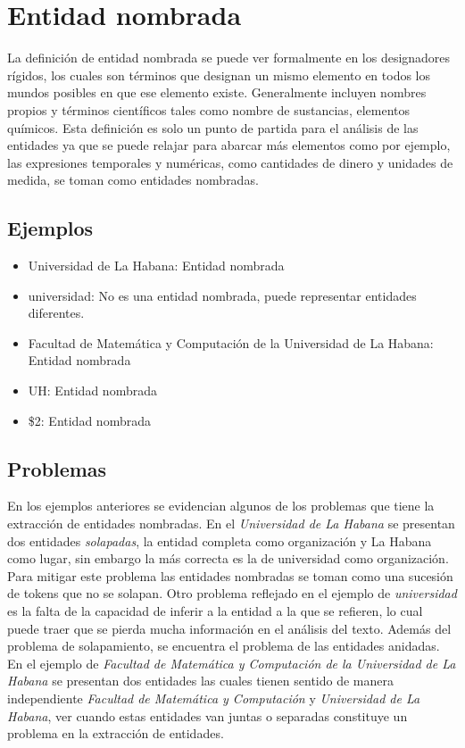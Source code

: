 \documentclass[runningheads]{llncs}
\begin{document}
\section{Entidad nombrada}

La definición de entidad nombrada se puede ver formalmente en los designadores rígidos\cite{rigid_designator}, los cuales son términos que designan un mismo elemento en todos los mundos posibles en que ese elemento existe. Generalmente incluyen nombres propios y términos científicos tales como nombre de sustancias, elementos químicos. Esta definición es solo un punto de partida para el análisis de las entidades ya que se puede relajar  para abarcar más elementos como por ejemplo, las expresiones temporales y numéricas, como cantidades de dinero y unidades de medida, se toman como entidades nombradas. 

\subsection{Ejemplos}

\begin{itemize}

\item Universidad de La Habana: Entidad nombrada
\item universidad: No es una entidad nombrada, puede representar entidades diferentes.
\item Facultad de Matemática y Computación de la Universidad de La Habana: Entidad nombrada
\item UH: Entidad nombrada
\item \$2: Entidad nombrada
\end{itemize}

\subsection{Problemas}

En los ejemplos anteriores se evidencian algunos de los problemas que tiene la extracción de entidades nombradas. En el \emph{Universidad de La Habana} se presentan dos entidades \emph{solapadas}, la entidad completa como organización y La Habana como lugar, sin embargo la más correcta es la de universidad como organización. Para mitigar este problema las entidades nombradas se toman como una sucesión de tokens que no se solapan. Otro problema reflejado en el ejemplo de \emph{universidad} es la falta de la capacidad de inferir a la entidad a la que se refieren, lo cual puede traer que se pierda mucha información en el análisis del texto. Además del problema de solapamiento, se encuentra el problema de las entidades anidadas. En el ejemplo de \emph{Facultad de Matemática y Computación de la Universidad de La Habana} se presentan dos entidades las cuales tienen sentido de manera independiente \emph{Facultad de Matemática y Computación} y \emph{Universidad de La Habana}, ver cuando estas entidades van juntas o separadas constituye un problema en la extracción de entidades.
\end{document}
